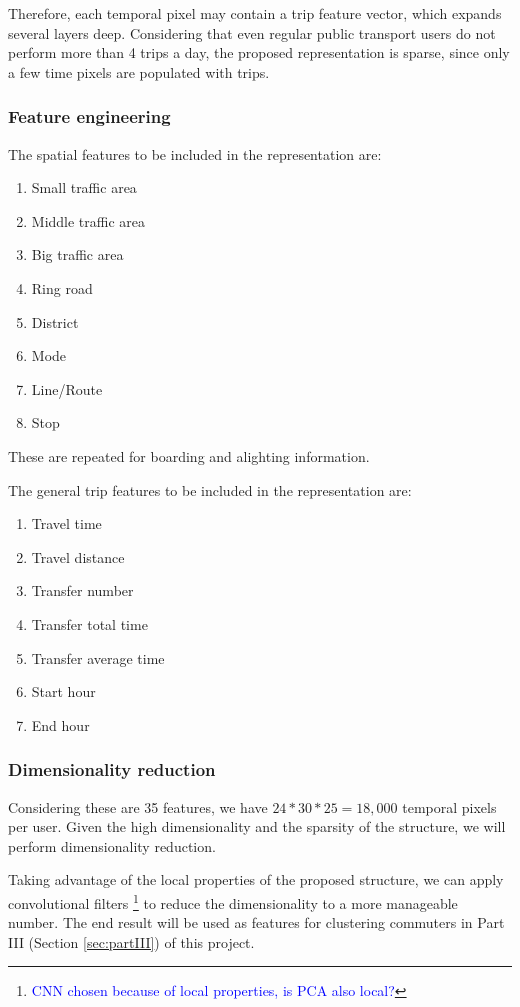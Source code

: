 \documentclass{article}
\newcommand{\technicalDoubt}[1]{\footnote{\textcolor{blue}{#1}}}
\begin{document}
Therefore, each temporal pixel may contain a trip feature vector, which expands several layers deep. Considering that even regular public transport users do not perform more than 4 trips a day, the proposed representation is sparse, since only a few time pixels are populated with trips.  


\subsubsection{Feature engineering}
The spatial features to be included in the representation are:

\begin{enumerate}
\item Small traffic area
\item Middle traffic area
\item Big traffic area
\item Ring road
\item District
\item Mode
\item Line/Route
\item Stop
\end{enumerate}

These are repeated for boarding and alighting information.

The general trip features to be included in the representation are: 

\begin{enumerate}
\item Travel time
\item Travel distance
\item Transfer number
\item Transfer total time
\item Transfer average time
\item Start hour
\item End hour
\end{enumerate}

\subsubsection{Dimensionality reduction}
Considering these are 35 features, we have $24 * 30 * 25 = 18,000$ temporal pixels per user. Given the high dimensionality and the sparsity of the structure, we will perform dimensionality reduction. 

Taking advantage of the local properties of the proposed structure, we can apply convolutional filters \technicalDoubt{CNN chosen because of local properties, is PCA also local?} to reduce the dimensionality to a more manageable number. The end result will be used as features for clustering commuters in Part III (Section \ref{sec:partIII}) of this project. 
\end{document}
